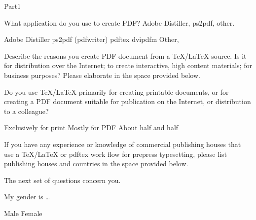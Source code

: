 \documentclass{article}
\begin{document}
\begin{exam}{Part1}
\goodbreak
\begin{eqComments}\end{eqComments}

\begin{problem}
What application do you use to create PDF? Adobe Distiller, ps2pdf, other.
\begin{answers}{3}
\rowsep{1bp}
    \bChoices
         Adobe Distiller\eAns
         \textsf{ps2pdf} (\textsf{pdfwriter})\eAns
         \textsf{pdftex}\eAns
         \textsf{dvipdfm}\eAns
         Other, \eAns
    \eChoices
\end{answers}
\end{problem}

\begin{problem}
Describe the reasons you create PDF document from a \TeX/\LaTeX{} source. Is it for
distribution over the Internet; to create interactive, high
content materials; for business purposes? Please elaborate in the
space provided below.
\begin{solution}[.75in]
\end{solution}
\end{problem}

\begin{problem}
Do you use {\TeX/\LaTeX} primarily for creating printable documents, or for creating
a PDF document suitable for publication on the Internet, or distribution to a colleague?
\begin{answers}{3}
    \bChoices
     Exclusively for print\eAns
     Mostly for PDF\eAns
     About half and half\eAns
    \eChoices
\end{answers}
\end{problem}

\begin{problem}
If you have any experience or knowledge of commercial publishing
houses that use a \TeX/\LaTeX{} or \textsf{pdftex} work flow  for
prepress typesetting,  please list publishing houses and countries
in the space provided below.
\begin{solution}[.75in]
\end{solution}
\end{problem}

\begin{eqComments}
The next set of questions concern you.
\end{eqComments}

\begin{problem}
My gender is \dots
\begin{answers}{5}
    \bChoices
         Male\eAns
         Female\eAns
         \eAns
    \eChoices
\end{answers}
\end{problem}


\end{exam}
\end{document}
